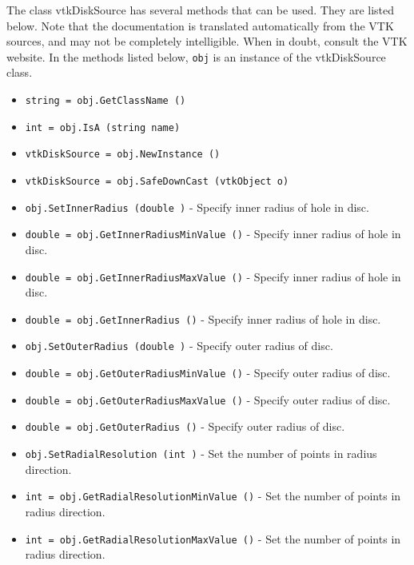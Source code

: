 The class vtkDiskSource has several methods that can be used.
  They are listed below.
Note that the documentation is translated automatically from the VTK sources,
and may not be completely intelligible.  When in doubt, consult the VTK website.
In the methods listed below, \verb|obj| is an instance of the vtkDiskSource class.
\begin{itemize}
\item  \verb|string = obj.GetClassName ()|

\item  \verb|int = obj.IsA (string name)|

\item  \verb|vtkDiskSource = obj.NewInstance ()|

\item  \verb|vtkDiskSource = obj.SafeDownCast (vtkObject o)|

\item  \verb|obj.SetInnerRadius (double )| -  Specify inner radius of hole in disc.

\item  \verb|double = obj.GetInnerRadiusMinValue ()| -  Specify inner radius of hole in disc.

\item  \verb|double = obj.GetInnerRadiusMaxValue ()| -  Specify inner radius of hole in disc.

\item  \verb|double = obj.GetInnerRadius ()| -  Specify inner radius of hole in disc.

\item  \verb|obj.SetOuterRadius (double )| -  Specify outer radius of disc.

\item  \verb|double = obj.GetOuterRadiusMinValue ()| -  Specify outer radius of disc.

\item  \verb|double = obj.GetOuterRadiusMaxValue ()| -  Specify outer radius of disc.

\item  \verb|double = obj.GetOuterRadius ()| -  Specify outer radius of disc.

\item  \verb|obj.SetRadialResolution (int )| -  Set the number of points in radius direction.

\item  \verb|int = obj.GetRadialResolutionMinValue ()| -  Set the number of points in radius direction.

\item  \verb|int = obj.GetRadialResolutionMaxValue ()| -  Set the number of points in radius direction.


\end{itemize}
